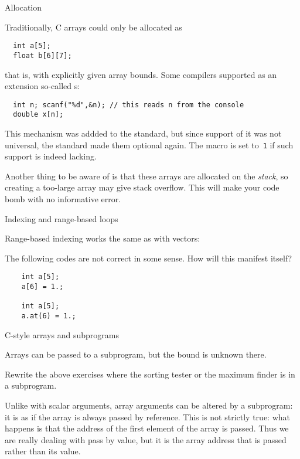  {Allocation}

Traditionally, C arrays could only be allocated as
\begin{lstlisting}
  int a[5];
  float b[6][7];
\end{lstlisting}
that is, with explicitly given array bounds.
Some compilers supported as an extension
so-called s:
\begin{lstlisting}
  int n; scanf("%d",&n); // this reads n from the console
  double x[n];
\end{lstlisting}
This mechanism was addded to the  standard,
but since support of it was not universal,
the  standard made them optional again.
The macro  is set to~\lstinline{1}
if such support is indeed lacking.

Another thing to be aware of is that these arrays
are allocated on the \emph{stack},
so creating a too-large array may give stack overflow.
This will make your code bomb with no informative error.


 {Indexing and range-based loops}

Range-based indexing works the same as with vectors:
%

\begin{review}
  The following codes are not correct in some sense. How will this manifest itself?
  \begin{lstlisting}
    int a[5];
    a[6] = 1.;

    int a[5];
    a.at(6) = 1.;
  \end{lstlisting}
\end{review}

 {C-style arrays and subprograms}

Arrays can be passed to a subprogram, but the bound is unknown there.
%
%
\begin{exercise}
  Rewrite the above exercises where the sorting tester or the maximum
  finder is in a subprogram.
\end{exercise}

Unlike with scalar arguments, array arguments can be altered by a
subprogram: it is as if the array is always passed by reference. This is
not strictly true: what happens is that the address of the first
element of the array is passed. Thus we are really dealing with pass
by value, but it is the array address that is passed rather than its value.

